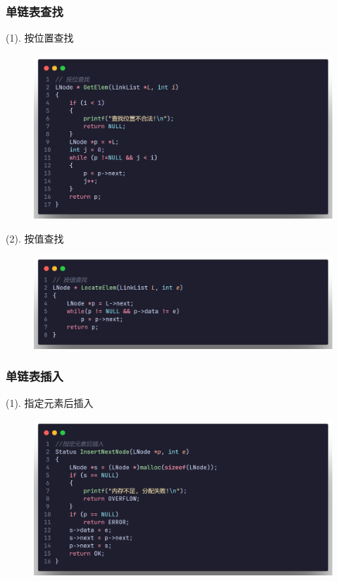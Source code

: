 \subsubsection{单链表查找}

(1). 按位置查找
\begin{figure}[H]
    \centering
    \includegraphics[scale=0.2]{"figure/Note/LinearList/SlNumSer.png"}
\end{figure} 

(2). 按值查找

\begin{figure}[H]
    \centering
    \includegraphics[scale=0.2]{"figure/Note/LinearList/SlItemSer.png"}
\end{figure} 

\subsubsection{单链表插入}

(1). 指定元素后插入

\begin{figure}[H]
    \centering
    \includegraphics[scale=0.2]{"figure/Note/LinearList/SlBInsert.png"}
\end{figure}

